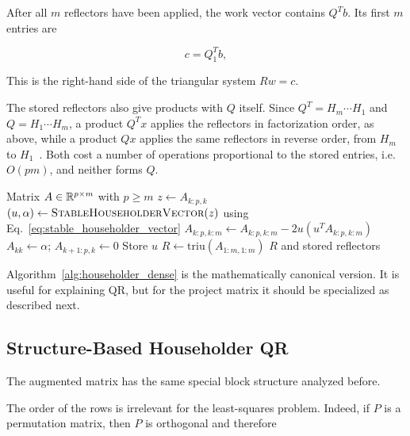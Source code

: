 \noindent After all $m$ reflectors have been applied, the work vector contains $Q^T b$. Its first
$m$ entries are

\begin{equation}
    c = Q_1^T b,
\end{equation}

\noindent This is the right-hand side of the triangular system $Rw=c$.

\noindent The stored reflectors also give products with $Q$ itself. Since
$Q^T = H_m \cdots H_1$ and $Q = H_1 \cdots H_m$,
a product $Q^T x$ applies the reflectors in factorization order, as above,
while a product $Q x$ applies the same reflectors in reverse order, from
$H_m$ to $H_1$~\cite[Algorithms~10.2 and~10.3]{trefethen1997}.
Both cost a number of operations proportional to the stored entries, i.e.\
$O(pm)$, and neither forms $Q$.

\begin{algorithm}[H]
\caption{Compact Dense Householder QR}
\label{alg:householder_dense}
\begin{algorithmic}[1]
    \Require Matrix $A\in\mathbb{R}^{p\times m}$ with $p\geq m$
        \State $z \gets A_{k:p,k}$
        \State $(u,\alpha) \gets \Call{StableHouseholderVector}{z}$ using Eq.~\eqref{eq:stable_householder_vector}
        \If{$u\neq0$}
            \State $A_{k:p,k:m} \gets A_{k:p,k:m} - 2u(u^T A_{k:p,k:m})$
        \EndIf
        \State $A_{kk}\gets\alpha$; \quad $A_{k+1:p,k}\gets0$
        \State Store $u$
    \EndFor
    \State $R \gets \mathrm{triu}(A_{1:m,1:m})$
    \State \Return $R$ and stored reflectors
\end{algorithmic}
\end{algorithm}

\noindent Algorithm~\ref{alg:householder_dense} is the mathematically canonical version. It is 
useful for explaining QR, but for the project matrix it should be specialized as 
described next.

\subsection{Structure-Based Householder QR}
\label{sec:structured_householder}

\noindent The augmented matrix has the same special block structure analyzed before.

\noindent The order of the rows is irrelevant for the least-squares problem. Indeed, if $P$ is a permutation matrix, then $P$ is orthogonal and therefore

